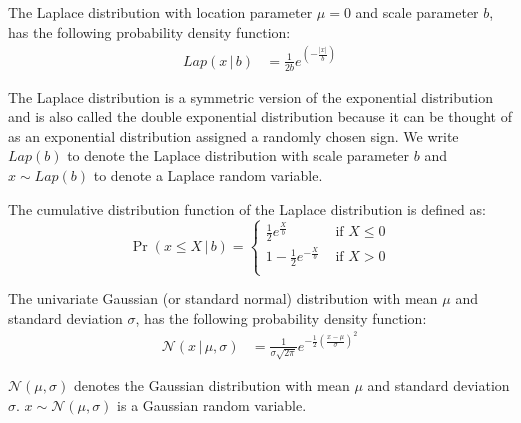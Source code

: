 \begin{definition}
    \label{def:LaplaceDistribution}
    The Laplace distribution with location parameter $\mu=0$ and scale parameter $b$, has the following probability density function:
    \begin{equation}
        \begin{split}
            Lap\left(x \,|\,b\right)&= \frac{1}{2b}e^{\left( -\frac{\left| x\right| }{b}\right)}
        \end{split}
    \end{equation}
\end{definition}
The Laplace distribution is a symmetric version of the exponential distribution and is also called the double exponential distribution because it can be thought of as an exponential distribution assigned a randomly chosen sign.
We write $Lap\left(b\right)$ to denote the Laplace distribution with scale parameter $b$ and $x \sim Lap\left( b\right)$ to denote a Laplace random variable.

The cumulative distribution function of the Laplace distribution is defined as:
\begin{equation}
    \Pr\left( x\leq X\,|\,b\right)=
    \begin{cases}
        \frac{1}{2} e^{\frac{X}{b}}     & \text{ if } X \leq 0 \\
        1- \frac{1}{2} e^{-\frac{X}{b}} & \text{ if } X > 0    \\
    \end{cases}
\end{equation}


\begin{definition}
    \label{def:GaussianDistribution}
    The univariate Gaussian (or standard normal) distribution with mean $\mu$ and standard deviation $\sigma$, has the following probability density function:
    \begin{equation}
        \begin{split}
            \mathcal{N} \left( x \,|\, \mu,\sigma\right)&=\frac{1}{\sigma\sqrt{2 \pi}}e^{-\frac{1}{2}\left( \frac{x-\mu}{\sigma}\right) ^{2}}
        \end{split}
    \end{equation}
\end{definition}
$\mathcal{N} \left( \mu,\sigma\right)$ denotes the Gaussian distribution with mean $\mu$ and standard deviation $\sigma$.
$x \sim \mathcal{N}  \left(\mu,\sigma\right)$ is a Gaussian random variable.


